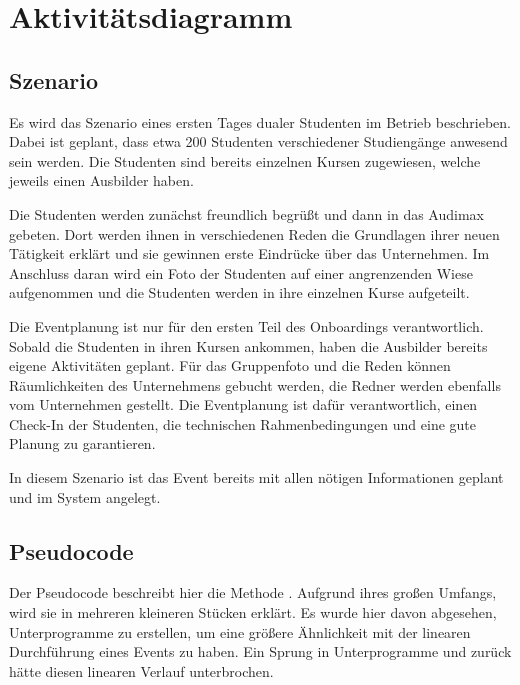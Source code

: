\chapter{Aktivitätsdiagramm}
\section{Szenario}
Es wird das Szenario eines ersten Tages dualer Studenten im Betrieb beschrieben. Dabei ist geplant, dass etwa 200 Studenten verschiedener Studiengänge anwesend sein werden. Die Studenten sind bereits einzelnen Kursen zugewiesen, welche jeweils einen Ausbilder haben.

Die Studenten werden zunächst freundlich begrüßt und dann in das Audimax gebeten. Dort werden ihnen in verschiedenen Reden die Grundlagen ihrer neuen Tätigkeit erklärt und sie gewinnen erste Eindrücke über das Unternehmen. Im Anschluss daran wird ein Foto der Studenten auf einer angrenzenden Wiese aufgenommen und die Studenten werden in ihre einzelnen Kurse aufgeteilt.

Die Eventplanung ist nur für den ersten Teil des Onboardings verantwortlich. Sobald die Studenten in ihren Kursen ankommen, haben die Ausbilder bereits eigene Aktivitäten geplant. Für das Gruppenfoto und die Reden können Räumlichkeiten des Unternehmens gebucht werden, die Redner werden ebenfalls vom Unternehmen gestellt. Die Eventplanung ist dafür verantwortlich, einen Check-In der Studenten, die technischen Rahmenbedingungen und eine gute Planung zu garantieren.

In diesem Szenario ist das Event bereits mit allen nötigen Informationen geplant und im System angelegt.

\section{Pseudocode}
Der Pseudocode beschreibt hier die Methode . Aufgrund ihres großen Umfangs, wird sie in mehreren kleineren Stücken erklärt. Es wurde hier davon abgesehen, Unterprogramme zu erstellen, um eine größere Ähnlichkeit mit der linearen Durchführung eines Events zu haben. Ein Sprung in Unterprogramme und zurück hätte diesen linearen Verlauf unterbrochen.

